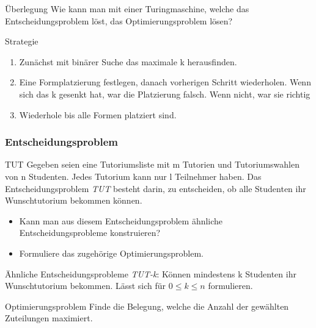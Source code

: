 \documentclass{beamer}
\begin{document}
\begin{frame}
 \begin{block}{Überlegung}
  Wie kann man mit einer Turingmaschine, welche das Entscheidungsproblem löst, das Optimierungsproblem lösen?
 \end{block}
\begin{block}{Strategie}
 \begin{enumerate}
  \item Zunächst mit binärer Suche das maximale k herausfinden.
  \item Eine Formplatzierung festlegen, danach vorherigen Schritt wiederholen. Wenn sich das k gesenkt hat, war die Platzierung falsch. 
  Wenn nicht, war sie richtig
  \item Wiederhole bis alle Formen platziert sind.
 \end{enumerate}
\end{block}
\end{frame}



\begin{frame}
 \frametitle{Entscheidungsproblem}
 \begin{block}{TUT}
  Gegeben seien eine Tutoriumsliste mit m Tutorien und Tutoriumswahlen von n Studenten. Jedes Tutorium kann nur l Teilnehmer haben.
 Das Entscheidungsproblem \textit{TUT} besteht darin, zu entscheiden, ob alle Studenten ihr Wunschtutorium bekommen können.
 \end{block}
 \begin{itemize}
  \item Kann man aus diesem Entscheidungsproblem ähnliche Entscheidungsprobleme konstruieren?
  \item Formuliere das zugehörige Optimierungsproblem.
 \end{itemize}
\end{frame}

\begin{frame}
 \begin{block}{Ähnliche Entscheidungsprobleme}
  \textit{TUT-k}: Können mindestens k Studenten ihr Wunschtutorium bekommen.
  Lässt sich für $0 \leq k \leq n$ formulieren.
 \end{block}
 \begin{block}{Optimierungsproblem}
  Finde die Belegung, welche die Anzahl der gewählten Zuteilungen maximiert.
 \end{block}
\end{frame}
\end{document}
